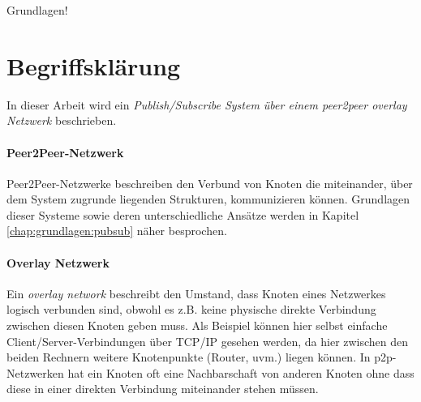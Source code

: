 Grundlagen!
\section{Begriffsklärung}
In dieser Arbeit wird ein \emph{Publish/Subscribe System über einem peer2peer overlay Netzwerk} beschrieben.

\paragraph{Peer2Peer-Netzwerk} Peer2Peer-Netzwerke beschreiben den Verbund von Knoten die miteinander, über dem System zugrunde liegenden Strukturen, kommunizieren können. Grundlagen dieser Systeme sowie deren unterschiedliche Ansätze werden in Kapitel \ref{chap:grundlagen:pubsub} näher besprochen.

\paragraph{Overlay Netzwerk} Ein \emph{overlay network} beschreibt den Umstand, dass Knoten eines Netzwerkes logisch verbunden sind, obwohl es z.B. keine physische direkte Verbindung zwischen diesen Knoten geben muss. Als Beispiel können hier selbst einfache Client/Server-Verbindungen über TCP/IP gesehen werden, da hier zwischen den beiden Rechnern weitere Knotenpunkte (Router, uvm.) liegen können. In p2p-Netzwerken hat ein Knoten oft eine Nachbarschaft von anderen Knoten ohne dass diese in einer direkten Verbindung miteinander stehen müssen. 


\label{chap:grundlagen:overlay}


\label{chap:grundlagen:pubsub}

